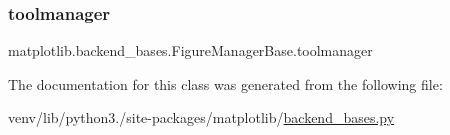\subsubsection{\texorpdfstring{toolmanager}{toolmanager}}
{\footnotesize\ttfamily matplotlib.\+backend\+\_\+bases.\+Figure\+Manager\+Base.\+toolmanager}



The documentation for this class was generated from the following file\+:\begin{DoxyCompactItemize}
\item 
venv/lib/python3./site-\/packages/matplotlib/\hyperlink{backend__bases_8py}{backend\+\_\+bases.\+py}\end{DoxyCompactItemize}
